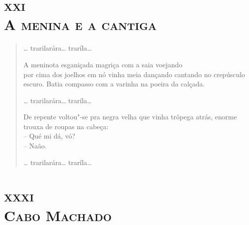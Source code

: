 \chapter[\textsc{xxi}\ \ \textsc{A menina e a cantiga}]{\textsc{xxi}\\\textsc{A menina e a cantiga}}


\begin{verse}
\ldots{} trarilarára\ldots{} traríla\ldots{}

A meninota esganiçada magriça com a saia voejando\\
por cima dos joelhos em nó vinha meia dançando cantando no crepúsculo escuro. Batia compasso com a varinha na poeira da calçada.

\ldots{} trarilarára\ldots{} traríla\ldots{}

De repente voltou"-se pra negra velha que vinha trôpega atrás, enorme trouxa de roupas na cabeça:\\
-- Qué mi dá, vó?\\
-- Naão.

\ldots{} trarilarára\ldots{} traríla\ldots{}
\end{verse}

\chapter[\textsc{xxxi}\ \ \textsc{Cabo Machado}]{\textsc{xxxi}\\\textsc{Cabo Machado}}

